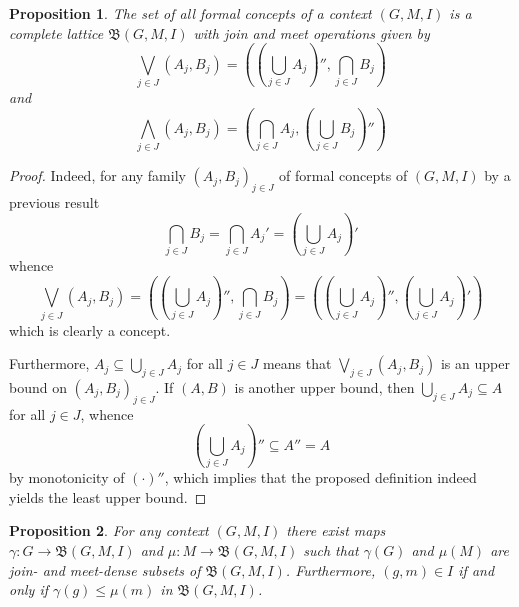 \documentclass[a4paper]{article}
\newcommand{\brac}[1]{{\left ( #1 \right )}}
\newcommand{\cltc}{\mathfrak{B}}
\newtheorem{prop}{Proposition}
\begin{document}
\begin{prop} The set of all formal concepts of a context $(G,M,I)$ is a complete lattice $\cltc(G,M,I)$ with join and meet operations given by \[\bigvee_{j\in J} (A_j,B_j) = \brac{ \brac{\bigcup_{j\in J} A_j}'', \bigcap_{j\in J} B_j}\] and \[\bigwedge_{j\in J} (A_j,B_j) = \brac{\bigcap_{j\in J} A_j, \brac{\bigcup_{j\in J} B_j}''}\]
\end{prop}

\begin{proof}
Indeed, for any family $\brac{A_j,B_j}_{j\in J}$ of formal concepts of $(G,M,I)$ by a previous result \[\bigcap_{j\in J} B_j = \bigcap_{j\in J} A_j' = \brac{\bigcup_{j\in J} A_j}'\] whence \[\bigvee_{j\in J} (A_j,B_j) = \brac{ \brac{\bigcup_{j\in J} A_j}'', \bigcap_{j\in J} B_j} = \brac{ \brac{\bigcup_{j\in J} A_j}'', \brac{\bigcup_{j\in J} A_j}'}\] which is clearly a concept.

Furthermore, $A_j\subseteq \bigcup_{j\in J} A_j$ for all $j\in J$ means that $\bigvee_{j\in J} (A_j,B_j)$ is an upper bound on $\brac{A_j,B_j}_{j\in J}$. If $(A,B)$ is another upper bound, then $\bigcup_{j\in J} A_j\subseteq A$ for all $j\in J$, whence \[\brac{\bigcup_{j\in J} A_j}'' \subseteq A'' = A\] by monotonicity of ${(\cdot)}''$, which implies that the proposed definition indeed yields the least upper bound.
\end{proof}

\begin{prop} For any context $(G,M,I)$ there exist maps $\gamma:G\to\cltc(G,M,I)$ and $\mu:M\to\cltc(G,M,I)$ such that $\gamma(G)$ and $\mu(M)$ are join- and meet-dense subsets of $\cltc(G,M,I)$. Furthermore, $(g,m)\in I$ if and only if $\gamma(g)\leq \mu(m)$ in $\cltc(G,M,I)$.
\end{prop}
\end{document}
